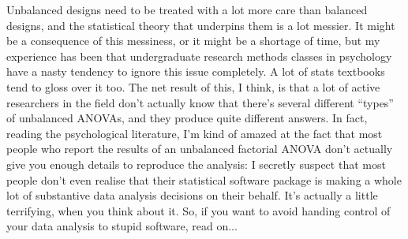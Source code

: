 Unbalanced designs need to be treated with a lot more care than balanced designs, and the statistical theory that underpins them is a lot messier. It might be a consequence of this messiness, or it might be a shortage of time, but my experience has been that undergraduate research methods classes in psychology have a nasty tendency to ignore this issue completely. A lot of stats textbooks tend to gloss over it too. The net result of this, I think, is that a lot of active researchers in the field don't actually know that there's several different ``types'' of unbalanced ANOVAs, and they produce quite different answers. In fact, reading the psychological literature, I'm kind of amazed at the fact that most people who report the results of an unbalanced factorial ANOVA don't actually give you enough details to reproduce the analysis: I secretly suspect that most people don't even realise that their statistical software package is making a whole lot of substantive data analysis decisions on their behalf. It's actually a little terrifying, when you think about it. So, if you want to avoid handing control of your data analysis to stupid software, read on...


